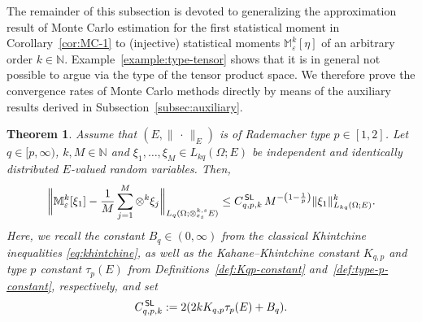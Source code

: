 \documentclass[reqno]{amsart}
\numberwithin{equation}{section}
\newcommand{\bbM}{\mathbb{M}}
\newcommand{\bbN}{\mathbb{N}}
\newcommand{\xk}{\otimes^k}
\newcommand{\xkseps}{\otimes^{k,s}_{\varepsilon_s}}
\newcommand{\Mk}{\bbM^k_\varepsilon}
\newcommand{\norm}[2]{     \| #1       \|_{ #2 }}
\newcommand{\CSL}{C^{\,\sf SL}_{q,p,k}}
\newtheorem{theorem}[lemma]{Theorem}
\theoremstyle{remark}
\theoremstyle{definition}
\begin{document}
The remainder of this subsection is devoted to generalizing 
the approximation result of Monte Carlo estimation 
for the first statistical moment in Corollary~\ref{cor:MC-1} 
to (injective) statistical moments $\Mk[\eta]$ 
of an arbitrary order $k\in\bbN$. 
Example~\ref{example:type-tensor} shows that 
it is in general not possible to argue via the type 
of the tensor product space. 
We therefore prove the convergence rates of Monte Carlo methods 
directly by means of the auxiliary results derived in  
Subsection~\ref{subsec:auxiliary}. 

\begin{theorem}\label{thm:MC-k} 
	Assume that  
	$(E,\norm{\,\cdot\,}{E})$ 
	is of Rademacher type $p\in[1,2]$. 
	Let $q\in[p,\infty)$, $k,M\in\bbN$ 
	and $\xi_1,\ldots,\xi_M\in L_{kq}(\Omega;E)$ be 
	independent and identically distributed 
	$E$-valued random variables. 
	Then, 
	\begin{equation}\label{eq:thm:MC-k}  	
		\biggl\| 
		\Mk[\xi_1] 
		-
		\frac{1}{M} 
		\sum_{j=1}^M 
		\xk \xi_j 
		\biggr\|_{L_q(\Omega;\xkseps E)} 
		\leq 
		\CSL \,  
		M^{-\left( 1-\frac{1}{p} \right)} 
		\norm{ \xi_1 }{L_{kq}(\Omega; E)}^k .  
	\end{equation} 
	Here, we recall  
	the constant $B_q\in(0,\infty)$   
	from the classical 
	Khintchine inequalities \eqref{eq:khintchine},  
	as well as the Kahane--Khintchine constant $K_{q,p}$   
	and type $p$ constant $\tau_p(E)$  
	from Definitions~\ref{def:Kqp-constant} and~\ref{def:type-p-constant}, 
	respectively, and set 
	\begin{equation}\label{eq:CSL} 
	\CSL := 2 (2 k  K_{q,p} \tau_p(E) + B_q). 
	\end{equation}
\end{theorem} 
\end{document}
